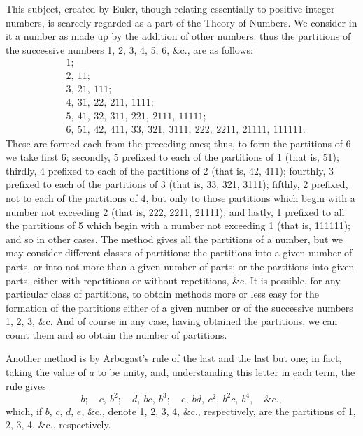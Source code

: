 \documentclass[11pt,a4paper]{book}
\begin{document}
This subject, created by Euler, though relating essentially to positive integer numbers, is scarcely regarded as a part of the Theory of Numbers. We consider in it a number as made up by the addition of other numbers: thus the partitions of the successive numbers 1, 2, 3, 4, 5, 6, \&c., are as follows:
\begin{align*}
&1;\\
&2, \ 11;\\
&3, \ 21, \ 111;\\
&4, \ 31, \ 22, \ 211, \ 1111;\\
&5, \ 41, \ 32, \ 311, \ 221, \ 2111, \ 11111;\\
&6, \ 51, \ 42, \ 411, \ 33, \ 321, \ 3111, \ 222, \ 2211, \ 21111, \ 111111.
\end{align*}
These are formed each from the preceding ones; thus, to form the partitions of 6 we take first 6; secondly, 5 prefixed to each of the partitions of 1 (that is, 51); thirdly, 4 prefixed to each of the partitions of 2 (that is, 42, 411); fourthly, 3 prefixed to each of the partitions of 3 (that is, 33, 321, 3111); fifthly, 2 prefixed, not to each of the partitions of 4, but only to those partitions which begin with a number not exceeding 2 (that is, 222, 2211, 21111); and lastly, 1 prefixed to all the partitions of 5 which begin with a number not exceeding 1 (that is, 111111); and so in other cases. The method gives all the partitions of a number, but we may consider different classes of partitions: the partitions into a given number of parts, or into not more than a given number of parts; or the partitions into given parts, either with repetitions or without repetitions, \&c. It is possible, for any particular class of partitions, to obtain methods more or less easy for the formation of the partitions either of a given number or of the successive numbers 1, 2, 3, \&c. And of course in any case, having obtained the partitions, we can count them and so obtain the number of partitions.

Another method is by Arbogast's rule of the last and the last but one; in fact, taking the value of $a$ to be unity, and, understanding this letter in each term, the rule gives
\[
b; \quad c,\ b^{2}; \quad d,\ bc,\ b^{3}; \quad e,\ bd,\ c^{2},\ b^{2}c,\ b^{4}, \quad \&c.,
\]
which, if $b$, $c$, $d$, $e$, \&c., denote 1, 2, 3, 4, \&c., respectively, are the partitions of 1, 2, 3, 4, \&c., respectively.
\end{document}
